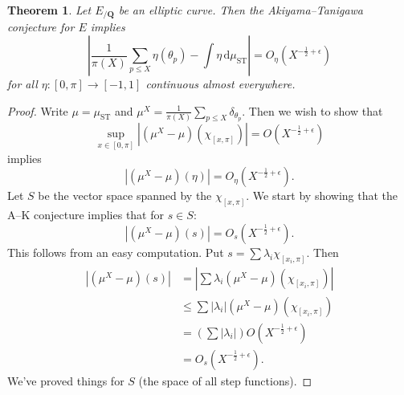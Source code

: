 \documentclass{article}
\DeclareMathOperator{\ST}{ST}
\newcommand{\bQ}{\mathbf{Q}}
\newcommand{\dd}{\mathrm{d}}
\newtheorem{theorem}{Theorem}
\numberwithin{theorem}{section}
\begin{document}
\begin{theorem}
Let $E_{/\bQ}$ be an elliptic curve. Then the Akiyama--Tanigawa conjecture for 
$E$ implies 
\[
	\left| \frac{1}{\pi(X)} \sum_{p\leqslant X} \eta(\theta_p) - \int \eta\, \dd \mu_{\ST}\right| = O_\eta(X^{-\frac 1 2+\epsilon})
\]
for all $\eta\colon [0,\pi] \to [-1,1]$ continuous almost everywhere. 
\end{theorem}
\begin{proof}
Write $\mu=\mu_{\ST}$ and 
$\mu^X = \frac{1}{\pi(X)} \sum_{p\leqslant X} \delta_{\theta_p}$. Then we wish 
to show that 
\[
	\sup_{x\in [0,\pi]} |(\mu^X-\mu)(\chi_{[x,\pi]})| = O(X^{-\frac 1 2+\epsilon})
\]
implies 
\[
	|(\mu^X-\mu)(\eta)| = O_\eta(X^{-\frac 1 2+\epsilon}) .
\]
Let $S$ be the vector space spanned by the $\chi_{[x,\pi]}$. We start by 
showing that the A--K conjecture implies that for $s\in S$:
\[
	|(\mu^X-\mu)(s)| = O_s(X^{-\frac 1 2+\epsilon}) .
\]
This follows from an easy computation. Put $s=\sum \lambda_i \chi_{[x_i,\pi]}$. 
Then 
\begin{align*}
	|(\mu^X-\mu)(s)| 
		&= \left| \sum \lambda_i (\mu^X-\mu)(\chi_{[x_i,\pi]})\right| \\
		&\leqslant \sum |\lambda_i| (\mu^X-\mu)(\chi_{[x_i,\pi]}) \\
		&= \left(\sum |\lambda_i|\right) O(X^{-\frac 1 2+\epsilon}) \\
		&= O_s(X^{-\frac 1 2 +\epsilon}) .
\end{align*}
We've proved things for $S$ (the space of all step functions). 
\end{proof}





\printbibliography
\end{document}
